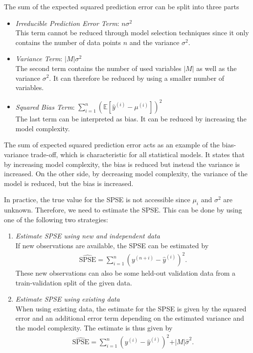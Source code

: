 \documentclass[10pt,a4paper]{article}
\begin{document}
The sum of the expected squared prediction error can be split into three parts

\begin{itemize}
	\item \emph{Irreducible Prediction Error Term}: $n\sigma^2$ \\
	This term cannot be reduced through model selection techniques since it only contains the number of data points $n$ and the variance $\sigma^2$.

	\item \emph{Variance Term}: $\vert M \vert \sigma^2$ \\
	The second term contains the number of used variables $\vert M \vert$ as well as the variance $\sigma^2$. It can therefore be reduced by using a smaller number of variables.
	
	\item \emph{Squared Bias Term}: $\sum_{i=1}^{n} (\mathbb{E}[\hat y^{(i)} - \mu^{(i)}])^2$\\
	The last term can be interpreted as bias. It can be reduced by increasing the model complexity.
\end{itemize}

The sum of expected squared prediction error acts as an example of the bias-variance trade-off, which is characteristic for all statistical models. It states that by increasing model complexity, the bias is reduced but instead the variance is increased. On the other side, by decreasing model complexity, the variance of the model is reduced, but the bias is increased. \cite{bishop2006patternRecognition}


In practice, the true value for the SPSE is not accessible since $\mu_i$ and $\sigma^2$ are unknown. Therefore, we need to estimate the SPSE. This can be done by using one of the following two strategies:

\begin{enumerate}

	\item \emph{Estimate SPSE using new and independent data} \\	
	If new observations are available, the SPSE can be estimated by
	\begin{align}
		\widehat{\text{SPSE}} = \sum_{i=1}^n (y^{(n+i)} - \hat y^{(i)})^2.
	\end{align}
	These new observations can also be some held-out validation data from a train-validation split of the given data. 
	
	\item \emph{Estimate SPSE using existing data} \\
	When using existing data, the estimate for the SPSE is given by the squared error and an additional error term depending on the estimated variance and the model complexity. The estimate is thus given by
	\begin{align}
		\widehat{\text{SPSE}} = \sum_{i=1}^n(y^{(i)} - \hat y^{(i)})^2 + \vert M \vert \hat \sigma^2.
	\end{align}

\end{enumerate}
\end{document}
